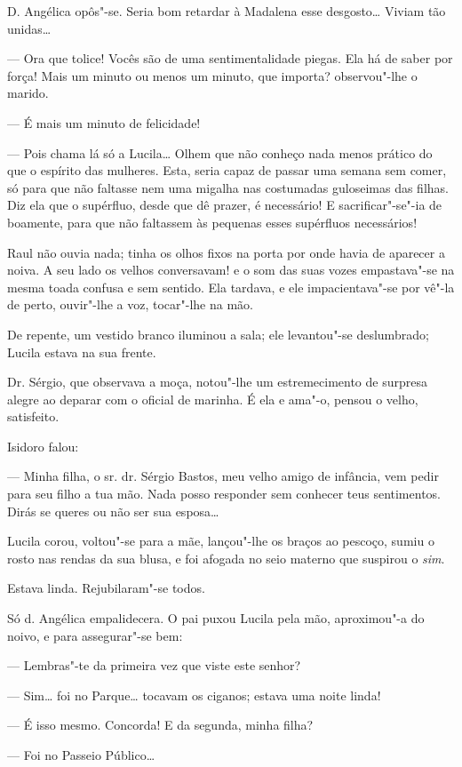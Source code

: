 D. Angélica opôs"-se. Seria bom retardar à Madalena esse desgosto\ldots{}
Viviam tão unidas\ldots{}

--- Ora que tolice! Vocês são de uma sentimentalidade piegas. Ela há de
saber por força! Mais um minuto ou menos um minuto, que importa?
observou"-lhe o marido.

--- É mais um minuto de felicidade!

--- Pois chama lá só a Lucila\ldots{} Olhem que não conheço nada menos
prático do que o espírito das mulheres. Esta, seria capaz de passar uma
semana sem comer, só para que não faltasse nem uma migalha nas
costumadas guloseimas das filhas. Diz ela que o supérfluo, desde que dê
prazer, é necessário! E sacrificar"-se"-ia de boamente, para que não
faltassem às pequenas esses supérfluos necessários!

Raul não ouvia nada; tinha os olhos fixos na porta por onde havia de
aparecer a noiva. A seu lado os velhos conversavam! e o som das suas
vozes empastava"-se na mesma toada confusa e sem sentido. Ela tardava, e
ele impacientava"-se por vê"-la de perto, ouvir"-lhe a voz, tocar"-lhe na
mão.

De repente, um vestido branco iluminou a sala; ele levantou"-se
deslumbrado; Lucila estava na sua frente.

Dr. Sérgio, que observava a moça, notou"-lhe um estremecimento de
surpresa alegre ao deparar com o oficial de marinha. É ela e ama"-o,
pensou o velho, satisfeito.

Isidoro falou:

--- Minha filha, o sr. dr. Sérgio Bastos, meu velho amigo de infância,
vem pedir para seu filho a tua mão. Nada posso responder sem conhecer
teus sentimentos. Dirás se queres ou não ser sua esposa\ldots{}

Lucila corou, voltou"-se para a mãe, lançou"-lhe os braços ao pescoço,
sumiu o rosto nas rendas da sua blusa, e foi afogada no seio materno que
suspirou o \emph{sim}.

Estava linda. Rejubilaram"-se todos.

Só d. Angélica empalidecera. O pai puxou Lucila pela mão, aproximou"-a do
noivo, e para assegurar"-se bem:

--- Lembras"-te da primeira vez que viste este senhor?

--- Sim\ldots{} foi no Parque\ldots{} tocavam os ciganos; estava uma noite linda!

--- É isso mesmo. Concorda! E da segunda, minha filha?

--- Foi no Passeio Público\ldots{}

